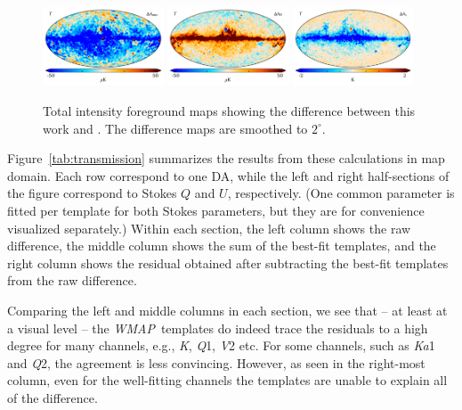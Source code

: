 \documentclass[twocolumn]{../../common/aa}
\def\WMAP{\emph{WMAP}}
\newcommand{\K}[0]{\textit K}
\newcommand{\Ka}[0]{\textit{Ka}}
\newcommand{\Q}[0]{\textit Q}
\newcommand{\V}[0]{\textit V}
\begin{document}
\begin{figure}
	\centering
	\includegraphics[width=0.32\textwidth]{figures/CG_minus_BP_ame.pdf}
	\includegraphics[width=0.32\textwidth]{figures/CG_minus_BP_ff.pdf}
	\includegraphics[width=0.32\textwidth]{figures/CG_minus_BP_synch.pdf}
	\caption{Total intensity foreground maps showing the difference between this work and \cite{bp01}. The difference maps are smoothed to $2^\circ$.}\label{fig:intensity_foregrounds_diff}
\end{figure}


Figure~\ref{tab:transmission} summarizes the results from these calculations in map domain. Each row correspond to one DA, while the left and right half-sections of the figure correspond to Stokes $Q$ and $U$, respectively. (One common parameter is fitted per template for both Stokes parameters, but they are for convenience visualized separately.) Within each section, the left column shows the raw difference, the middle column shows the sum of the best-fit templates, and the right column shows the residual obtained after subtracting the best-fit templates from the raw difference.


Comparing the left and middle columns in each section, we see that -- at least at a visual level -- the \WMAP\ templates do indeed trace the residuals to a high degree for many channels, e.g., \K, \Q1, \V2 etc. For some channels, such as \Ka1 and \Q2, the agreement is less convincing. However, as seen in the right-most column, even for the well-fitting channels the templates are unable to explain all of the difference.
\end{document}
